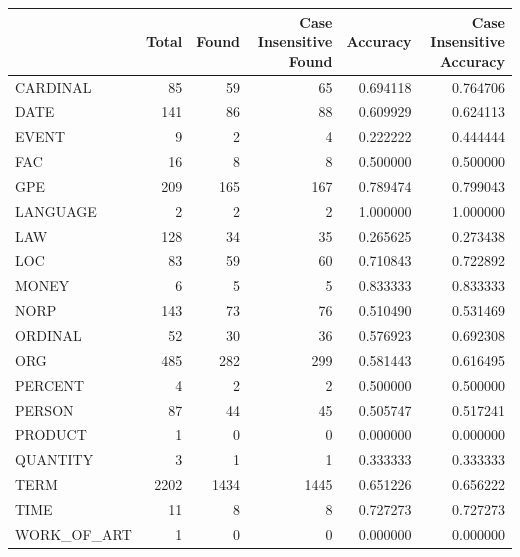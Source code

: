 \begin{tabular}{lrrrrr}
\toprule
 & Total & Found & Case Insensitive Found & Accuracy & Case Insensitive Accuracy \\
\midrule
CARDINAL & 85 & 59 & 65 & 0.694118 & 0.764706 \\
DATE & 141 & 86 & 88 & 0.609929 & 0.624113 \\
EVENT & 9 & 2 & 4 & 0.222222 & 0.444444 \\
FAC & 16 & 8 & 8 & 0.500000 & 0.500000 \\
GPE & 209 & 165 & 167 & 0.789474 & 0.799043 \\
LANGUAGE & 2 & 2 & 2 & 1.000000 & 1.000000 \\
LAW & 128 & 34 & 35 & 0.265625 & 0.273438 \\
LOC & 83 & 59 & 60 & 0.710843 & 0.722892 \\
MONEY & 6 & 5 & 5 & 0.833333 & 0.833333 \\
NORP & 143 & 73 & 76 & 0.510490 & 0.531469 \\
ORDINAL & 52 & 30 & 36 & 0.576923 & 0.692308 \\
ORG & 485 & 282 & 299 & 0.581443 & 0.616495 \\
PERCENT & 4 & 2 & 2 & 0.500000 & 0.500000 \\
PERSON & 87 & 44 & 45 & 0.505747 & 0.517241 \\
PRODUCT & 1 & 0 & 0 & 0.000000 & 0.000000 \\
QUANTITY & 3 & 1 & 1 & 0.333333 & 0.333333 \\
TERM & 2202 & 1434 & 1445 & 0.651226 & 0.656222 \\
TIME & 11 & 8 & 8 & 0.727273 & 0.727273 \\
WORK_OF_ART & 1 & 0 & 0 & 0.000000 & 0.000000 \\
\bottomrule
\end{tabular}
